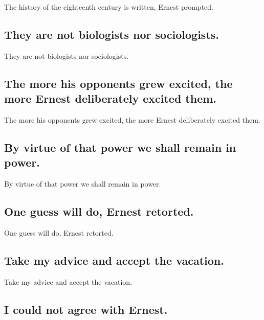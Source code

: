 \documentclass[]{article}
\begin{document}
The history of the eighteenth century is written, Ernest prompted.

\hypertarget{they-are-not-biologists-nor-sociologists.}{%
\subsection{They are not biologists nor
sociologists.}\label{they-are-not-biologists-nor-sociologists.}}

They are not biologists nor sociologists.

\hypertarget{the-more-his-opponents-grew-excited-the-more-ernest-deliberately-excited-them.}{%
\subsection{The more his opponents grew excited, the more Ernest
deliberately excited
them.}\label{the-more-his-opponents-grew-excited-the-more-ernest-deliberately-excited-them.}}

The more his opponents grew excited, the more Ernest deliberately
excited them.

\hypertarget{by-virtue-of-that-power-we-shall-remain-in-power.}{%
\subsection{By virtue of that power we shall remain in
power.}\label{by-virtue-of-that-power-we-shall-remain-in-power.}}

By virtue of that power we shall remain in power.

\hypertarget{one-guess-will-do-ernest-retorted.}{%
\subsection{One guess will do, Ernest
retorted.}\label{one-guess-will-do-ernest-retorted.}}

One guess will do, Ernest retorted.

\hypertarget{take-my-advice-and-accept-the-vacation.}{%
\subsection{Take my advice and accept the
vacation.}\label{take-my-advice-and-accept-the-vacation.}}

Take my advice and accept the vacation.

\hypertarget{i-could-not-agree-with-ernest.}{%
\subsection{I could not agree with
Ernest.}\label{i-could-not-agree-with-ernest.}}
\end{document}
